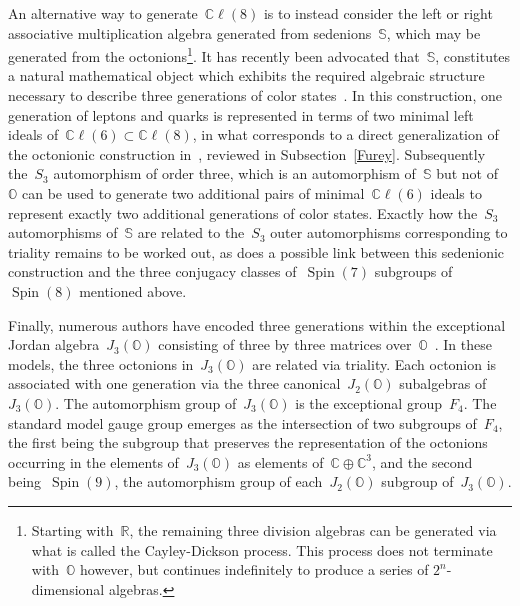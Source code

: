 \documentclass[reqno,11pt]{amsart}
\numberwithin{equation}{section}
\newcommand{\1}{\mbox{\rm 1 \hspace{-1.05 em} 1}}
\DeclareMathOperator{\Spin}{Spin}
\newcommand{\bb}[1]{\mathbb{#1}}
\begin{document}
An alternative way to generate~$\bb{C}\ell(8)$ is to instead consider the left or right associative multiplication algebra generated from sedenions~$\bb{S}$, which may be generated from the octonions\footnote{Starting with~$\mathbb{R}$, the remaining three division algebras can be generated via what is called the Cayley-Dickson process. This process does not terminate with~$\bb{O}$ however, but continues indefinitely to produce a series of $2^n$-dimensional algebras.}. It has recently been advocated that~$\bb{S}$, constitutes a natural mathematical object which exhibits the required algebraic structure necessary to describe three generations of color states~\cite{gillard2019three,gresnigt2019sedenions,gresnigt2023three}. In this construction, one generation of leptons and quarks is represented in terms of two minimal left ideals of~$\bb{C}\ell(6)\subset \bb{C}\ell(8)$, in what corresponds to a direct generalization of the octonionic construction in~\cite{furey2016standard}, reviewed in Subsection~\ref{Furey}. Subsequently the~$S_3$ automorphism of order three, which is an automorphism of~$\bb{S}$ but not of~$\bb{O}$ can be used to generate two additional pairs of minimal~$\bb{C}\ell(6)$ ideals to represent exactly two additional generations of color states. Exactly how the~$S_3$ automorphisms of~$\bb{S}$ are related to the~$S_3$ outer automorphisms corresponding to triality remains to be worked out, as does a possible link between this sedenionic construction and the three conjugacy classes of~$\Spin(7)$ subgroups of~$\Spin(8)$ mentioned above.  

Finally, numerous authors have encoded three generations within the exceptional Jordan algebra~$J_3(\bb{O})$ consisting of three by three matrices over~$\bb{O}$~\cite{dubois2016exceptional,dubois2019exceptional,todorov2018octonions,todorov2018deducing,boyle2020standard2,boyle2020standard}. In these models, the three octonions in~$J_3(\bb{O})$ are related via triality. Each octonion is associated with one generation via the three canonical~$J_2(\bb{O})$ subalgebras of~$J_3(\bb{O})$. The automorphism group of~$J_3(\bb{O})$ is the exceptional group~$F_4$. The standard model gauge group emerges as the intersection of two subgroups of~$F_4$, the first being the subgroup that preserves the representation of the octonions occurring in the elements of~$J_3(\bb{O})$ as elements of~$\bb{C}\oplus\bb{C}^3$, and the second being~$\Spin(9)$, the automorphism group of each~$J_2(\bb{O})$ subgroup of~$J_3(\bb{O})$.
\end{document}
